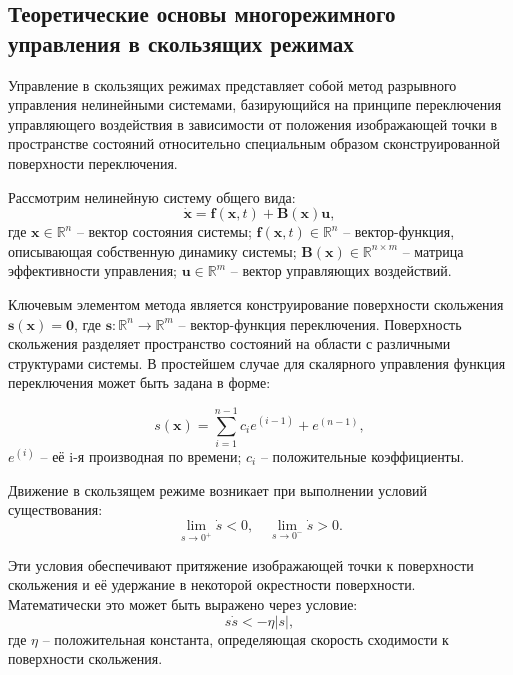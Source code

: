 \subsection{Теоретические основы многорежимного управления в скользящих режимах}\label{subsec:ch3/sec3/sub1}

Управление в скользящих режимах представляет собой метод разрывного управления нелинейными системами,
базирующийся на принципе переключения управляющего воздействия в зависимости от
положения изображающей точки в пространстве состояний относительно специальным образом
сконструированной поверхности переключения.

Рассмотрим нелинейную систему общего вида:
\begin{equation*}
	\dot{\mathbf{x}} = \mathbf{f}(\mathbf{x}, t) + \mathbf{B}(\mathbf{x})\mathbf{u},
\end{equation*}
где $\mathbf{x} \in \mathbb{R}^n$ -- вектор состояния системы;
$\mathbf{f}(\mathbf{x}, t) \in \mathbb{R}^n$ -- вектор-функция, описывающая собственную динамику системы;
$\mathbf{B}(\mathbf{x}) \in \mathbb{R}^{n \times m}$ -- матрица эффективности управления;
$\mathbf{u} \in \mathbb{R}^m$ -- вектор управляющих воздействий.

Ключевым элементом метода является конструирование поверхности скольжения $\mathbf{s}(\mathbf{x}) = \mathbf{0}$,
где $\mathbf{s}: \mathbb{R}^n \to \mathbb{R}^m$ -- вектор-функция переключения. Поверхность скольжения разделяет
пространство состояний на области с различными структурами системы. В простейшем случае для
скалярного управления функция переключения может быть задана в форме:

\begin{equation*}
	s(\mathbf{x}) = \sum_{i=1}^{n-1} c_i e^{(i-1)} + e^{(n-1)},
\end{equation*}
$e^{(i)}$ -- её i-я производная по времени;
$c_i$ -- положительные коэффициенты.

Движение в скользящем режиме возникает при выполнении условий существования:
\begin{equation*}
	\lim_{s \to 0^+} \dot{s} < 0, \quad \lim_{s \to 0^-} \dot{s} > 0.
\end{equation*}

Эти условия обеспечивают притяжение изображающей точки к поверхности скольжения и её
удержание в некоторой окрестности поверхности. Математически это может быть выражено через условие:
\begin{equation*}
	s\dot{s} < -\eta|s|,
\end{equation*}
где $\eta$ -- положительная константа, определяющая скорость сходимости к поверхности скольжения.

